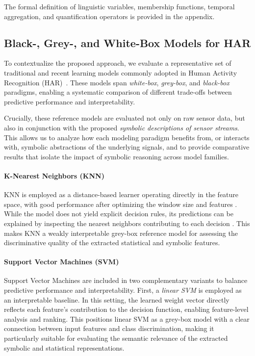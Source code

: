 \documentclass[preprint,12pt]{elsarticle}
\begin{document}
The formal definition of linguistic variables, membership functions, temporal aggregation, and quantification operators is provided in the appendix.

\subsection{Black-, Grey-, and White-Box Models for HAR}
\label{sec:reference_models}

To contextualize the proposed approach, we evaluate a representative set of traditional and recent learning models commonly adopted in Human Activity Recognition (HAR)~\cite{banos2014window, ordonez2016deep, o2019comparison, zhang2019comprehensive}. These models span \emph{white-box}, \emph{grey-box}, and \emph{black-box} paradigms, enabling a systematic comparison of different trade-offs between predictive performance and interpretability.

Crucially, these reference models are evaluated not only on raw sensor data, but also in conjunction with the proposed \emph{symbolic descriptions of sensor streams}. This allows us to analyze how each modeling paradigm benefits from, or interacts with, symbolic abstractions of the underlying signals, and to provide comparative results that isolate the impact of symbolic reasoning across model families.

\paragraph{K-Nearest Neighbors (KNN)}
KNN is employed as a distance-based learner operating directly in the feature space, with good performance after optimizing the window size and features \cite{banos2014window,reiss2012introducing}. While the model does not yield explicit decision rules, its predictions can be explained by inspecting the nearest neighbors contributing to each decision \cite{sivaroopan2025rag}. This makes KNN a weakly interpretable grey-box reference model for assessing the discriminative quality of the extracted statistical and symbolic features.

\paragraph{Support Vector Machines (SVM)}
Support Vector Machines are included in two complementary variants to balance predictive performance and interpretability. First, a \textit{linear SVM} is employed as an interpretable baseline. In this setting, the learned weight vector directly reflects each feature's contribution to the decision function, enabling feature-level analysis and ranking. This positions linear SVM as a grey-box model with a clear connection between input features and class discrimination, making it particularly suitable for evaluating the semantic relevance of the extracted symbolic and statistical representations.
\end{document}
